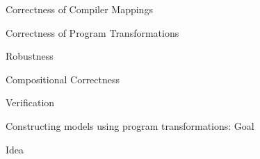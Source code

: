 \documentclass[notes, xcolor = dvipsnames]{beamer}
\begin{document}
    \begin{frame}{Correctness of Compiler Mappings}
        
    \end{frame}

    \begin{frame}{Correctness of Program Transformations}
        
    \end{frame}

    \begin{frame}{Robustness}
        
    \end{frame}

    \begin{frame}{Compositional Correctness}
    
    \end{frame}

    \begin{frame}{Verification}
        
    \end{frame}


    \begin{frame}{Constructing models using program transformations: Goal}

      
    \end{frame}

    \begin{frame}{Idea}



    \end{frame}
\end{document}
